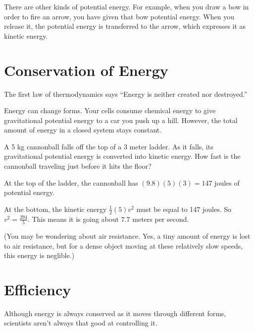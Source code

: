 There are other kinds of potential energy. For example, when you draw
a bow in order to fire an arrow, you have given that bow potential energy. When you release it,
the potential energy is transferred to the arrow, which expresses it
as kinetic energy.

\section{Conservation of Energy}

The first law of thermodynamics says ``Energy is neither created nor
destroyed.''

Energy can change forms. Your cells consume chemical energy to give
gravitational potential energy to a car you push up a hill. However, the total amount of
energy in a closed system stays constant.

\begin{Exercise}[title={The Energy of Falling}, label=energy_falling]

A 5 kg cannonball falls off the top of a 3 meter ladder. As it falls,
its gravitational potential energy is converted into kinetic energy.
How fast is the cannonball traveling just before
it hits the floor?

\end{Exercise}
\begin{Answer}[ref=energy_falling]

  At the top of the ladder, the cannonball has $(9.8)(5)(3) = 147$ joules of potential energy.

  At the bottom, the kinetic energy $\frac{1}{2}(5)v^2$ must be equal
  to 147 joules. So $v^2 = \frac{294}{5}$.  This means it is going about
  $7.7$ meters per second.

  (You may be wondering about air resistance. Yes, a tiny amount of energy is lost to air resistance, but for a dense
  object moving at these relatively slow speeds, this energy is
  neglible.)

\end{Answer}


\section{Efficiency}



Although energy is always conserved as it moves through different
forms, scientists aren't always that good at controlling it.

